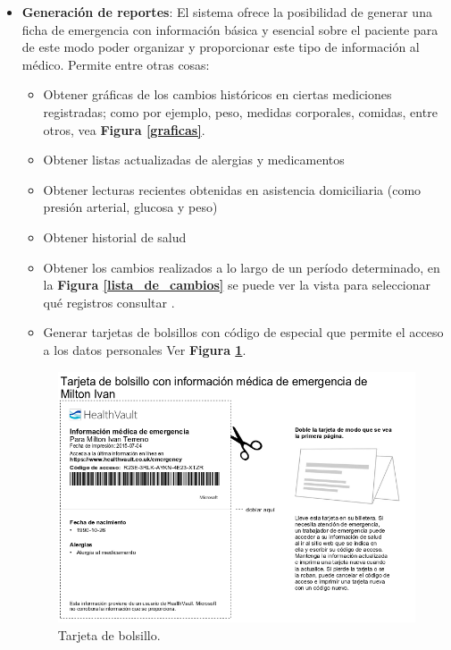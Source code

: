 \begin{itemize}
\item \textbf{Generación de reportes}: El sistema ofrece la posibilidad de generar una ficha de emergencia con información básica y esencial sobre el paciente para de este modo poder organizar y proporcionar este tipo de información al médico. Permite entre otras cosas:
	\begin{itemize}
		\item Obtener gráficas de los cambios históricos en ciertas mediciones registradas; como por ejemplo, peso, medidas corporales, comidas, entre otros, vea \textbf{Figura \ref{graficas}}.
        \item Obtener listas actualizadas de alergias y medicamentos
		\item Obtener lecturas recientes obtenidas en asistencia domiciliaria (como presión arterial, glucosa y peso)
		\item Obtener historial de salud
        \item Obtener los cambios realizados a lo largo de un período determinado, en la \textbf{Figura \ref{lista_de_cambios}} se puede ver la vista para seleccionar qué registros consultar .
        \item Generar tarjetas de bolsillos con código de especial que permite el acceso a los datos personales Ver \textbf{Figura \ref{tarjeta_bolsillo}}.
	\end{itemize}
    
    \begin{figure}[h]
      \centering
      \includegraphics[width=.8\textwidth]{img/tp1/3-tarjeta_bolsillo}
      \caption{Tarjeta de bolsillo.}
      \label{tarjeta_bolsillo}
    \end{figure} 
    

\end{itemize}
